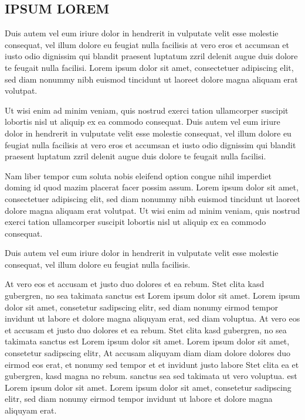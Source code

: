 \documentclass[]{../metanetpaper}
\begin{document}
\subsection{IPSUM LOREM}
Duis autem vel eum iriure dolor in hendrerit in vulputate velit esse molestie consequat, vel illum dolore eu feugiat nulla facilisis at vero eros et accumsan et iusto odio dignissim qui blandit praesent luptatum zzril delenit augue duis dolore te feugait nulla facilisi. Lorem ipsum dolor sit amet, consectetuer adipiscing elit, sed diam nonummy nibh euismod tincidunt ut laoreet dolore magna aliquam erat volutpat.   

Ut wisi enim ad minim veniam, quis nostrud exerci tation ullamcorper suscipit lobortis nisl ut aliquip ex ea commodo consequat. Duis autem vel eum iriure dolor in hendrerit in vulputate velit esse molestie consequat, vel illum dolore eu feugiat nulla facilisis at vero eros et accumsan et iusto odio dignissim qui blandit praesent luptatum zzril delenit augue duis dolore te feugait nulla facilisi.   

Nam liber tempor cum soluta nobis eleifend option congue nihil imperdiet doming id quod mazim placerat facer possim assum. Lorem ipsum dolor sit amet, consectetuer adipiscing elit, sed diam nonummy nibh euismod tincidunt ut laoreet dolore magna aliquam erat volutpat. Ut wisi enim ad minim veniam, quis nostrud exerci tation ullamcorper suscipit lobortis nisl ut aliquip ex ea commodo consequat.   

Duis autem vel eum iriure dolor in hendrerit in vulputate velit esse molestie consequat, vel illum dolore eu feugiat nulla facilisis.   

At vero eos et accusam et justo duo dolores et ea rebum. Stet clita kasd gubergren, no sea takimata sanctus est Lorem ipsum dolor sit amet. Lorem ipsum dolor sit amet, consetetur sadipscing elitr, sed diam nonumy eirmod tempor invidunt ut labore et dolore magna aliquyam erat, sed diam voluptua. At vero eos et accusam et justo duo dolores et ea rebum. Stet clita kasd gubergren, no sea takimata sanctus est Lorem ipsum dolor sit amet. Lorem ipsum dolor sit amet, consetetur sadipscing elitr, At accusam aliquyam diam diam dolore dolores duo eirmod eos erat, et nonumy sed tempor et et invidunt justo labore Stet clita ea et gubergren, kasd magna no rebum. sanctus sea sed takimata ut vero voluptua. est Lorem ipsum dolor sit amet. Lorem ipsum dolor sit amet, consetetur sadipscing elitr, sed diam nonumy eirmod tempor invidunt ut labore et dolore magna aliquyam erat.   
\end{document}
